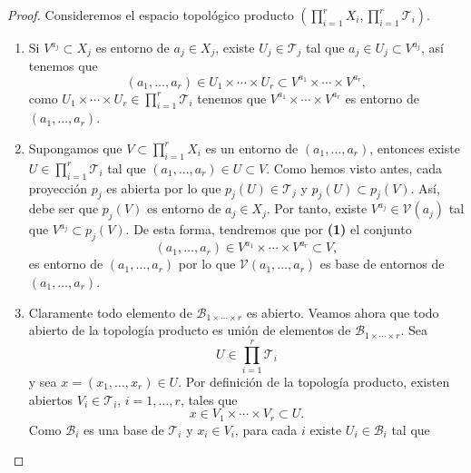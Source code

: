 \begin{proof}
	Consideremos el espacio topológico producto $\displaystyle \left(\prod^{r}_{i = 1}X_{i}, \prod^{r}_{i = 1}\mathcal{T}_{i}\right) $. 
	\begin{enumerate}
	\item Si $\displaystyle V^{a_{j}}\subset X_{j} $ es entorno de $\displaystyle a_{j}\in X_{j} $, existe $\displaystyle U_{j} \in \mathcal{T}_{j} $ tal que $\displaystyle a_{j}\in U_{j}\subset V^{a_{j}} $, así tenemos que 
		\[\left(a_{1}, \ldots, a_{r}\right)\in U_{1} \times \cdots \times U_{r} \subset V^{a_{1}} \times \cdots \times V^{a_{r}} ,\]
		como $\displaystyle U_{1} \times \cdots \times U_{r} \in \prod^{r}_{i = 1}\mathcal{T}_{i} $ tenemos que $\displaystyle V^{a_{1}} \times \cdots \times V^{a_{r}} $ es entorno de $\displaystyle \left(a_{1}, \ldots, a_{r}\right) $. 
	\item Supongamos que $\displaystyle V \subset \prod^{r}_{i = 1}X_{i} $ es un entorno de $\displaystyle \left(a_{1}, \ldots , a_{r}\right) $, entonces existe $\displaystyle U\in\prod^{r}_{i = 1}\mathcal{T}_{i} $ tal que $\displaystyle \left(a_{1}, \ldots, a_{r}\right)\in U\subset V $. Como hemos visto antes, cada proyección $\displaystyle p_{j} $ es abierta por lo que $\displaystyle p_{j}\left(U\right)\in \mathcal{T}_{j} $ y $\displaystyle p_{j}\left(U\right)\subset p_{j}\left(V\right) $. 
		Así, debe ser que $\displaystyle p_{j}\left(V\right) $ es entorno de $\displaystyle a_{j}\in X_{j} $. Por tanto, existe $\displaystyle V^{a_{j}}\in \mathcal{V}\left(a_{j}\right) $ tal que $\displaystyle V^{a_{j}}\subset p_{j}\left(V\right) $. De esta forma, tendremos que por \textbf{(1)} el conjunto
		\[\left(a_{1}, \ldots, a_{r}\right)\in V^{a_{1}} \times \cdots \times V^{a_{r}} \subset V,\]
	es entorno de $\displaystyle \left(a_{1}, \ldots, a_{r}\right) $ por lo que $\displaystyle \mathcal{V}\left(a_{1}, \ldots, a_{r}\right) $ es base de entornos de $\displaystyle \left(a_{1}, \ldots, a_{r}\right) $. 	
\item Claramente todo elemento de $\displaystyle \mathcal{B}_{1 \times \cdots \times r} $ es abierto. Veamos ahora que todo abierto de la topología producto es unión de elementos de $\mathcal{B}_{1\times\cdots\times r}$. Sea
\[U\in\prod_{i=1}^r\mathcal{T}_i\]
y sea $x=(x_1,\ldots,x_r)\in U$. Por definición de la topología producto, existen abiertos $V_i\in\mathcal{T}_i$, $i=1,\ldots,r$, tales que
\[x\in V_1\times\cdots\times V_r\subset U.\]
Como $\mathcal{B}_i$ es una base de $\mathcal{T}_i$ y $x_i\in V_i$, para cada $i$ existe $U_i\in\mathcal{B}_i$ tal que

\end{enumerate}
\end{proof}

